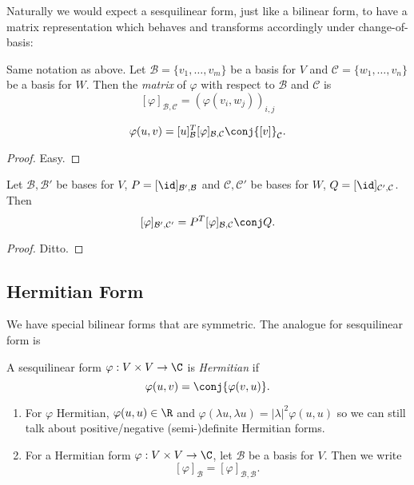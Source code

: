 \documentclass[a4paper]{article}
\newcommand*{\basis}{\mathcal}
\theoremstyle{definition}
\begin{document}
Naturally we would expect a sesquilinear form, just like a bilinear form, to have a matrix representation which behaves and transforms accordingly under change-of-basis:

\begin{definition}
  Same notation as above. Let \(\basis B = \{v_1, \dots, v_m\}\) be a basis for \(V\) and \(\basis C = \{w_1, \dots, v_n\}\) be a basis for \(W\). Then the \emph{matrix} of \(\varphi\) with respect to \(\basis B\) and \(\basis C\) is
  \[
    [\varphi]_{\basis B, \basis C} = \left(\varphi(v_i, w_j)\right)_{i,j}
  \]
\end{definition}

\begin{lemma}
  \[
    \varphi(u, v) = [u]_{\basis B}^T [\varphi]_{\basis B, \basis C} \conj{[v]}_{\basis C}.
  \]
\end{lemma}

\begin{proof}
  Easy.
\end{proof}

\begin{lemma}
  Let \(\basis B, \basis B'\) be bases for \(V\), \(P = [\id]_{\basis B', \basis B}\) and \(\basis C, \basis C'\) be bases for \(W\), \(Q = [\id]_{\basis C', \basis C}\). Then
  \[
    [\varphi]_{\basis B', \basis C'} = P^T [\varphi]_{\basis B, \basis C} \conj Q.
  \]
\end{lemma}

\begin{proof}
  Ditto.
\end{proof}

\subsection{Hermitian Form}

We have special bilinear forms that are symmetric. The analogue for sesquilinear form is

\begin{definition}
  A sesquilinear form \(\varphi: V \times V \to \C\) is \emph{Hermitian} if
  \[
    \varphi(u, v) = \conj{\varphi(v,u)}.
  \]
\end{definition}

\begin{note}\leavevmode
  \begin{enumerate}
  \item For \(\varphi\) Hermitian, \(\varphi(u, u) \in \R\) and \(\varphi(\lambda u, \lambda u) = |\lambda|^2 \varphi(u,u)\) so we can still talk about positive/negative (semi-)definite Hermitian forms.
  \item For a Hermitian form \(\varphi: V \times V \to \C\), let \(\basis B\) be a basis for \(V\). Then we write
    \[
      [\varphi]_{\basis B} = [\varphi]_{\basis B, \basis B}.
    \]
  \end{enumerate}
\end{note}
\end{document}
